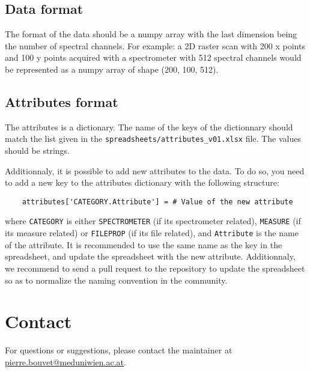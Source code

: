 \documentclass[a4paper,12pt]{article}
\begin{document}
\subsection{Data format}
The format of the data should be a numpy array with the last dimension being the number of spectral channels. For example: a 2D raster scan with 200 x points and 100 y points acquired with a spectrometer with 512 spectral channels would be represented as a numpy array of shape (200, 100, 512).

\subsection{Attributes format}
The attributes is a dictionary. The name of the keys of the dictionnary should match the list given in the \texttt{spreadsheets/attributes\_v01.xlsx} file. The values should be strings.

Additionnaly, it is possible to add new attributes to the data. To do so, you need to add a new key to the attributes dictionary with the following structure:
\begin{verbatim}
    attributes['CATEGORY.Attribute'] = # Value of the new attribute
\end{verbatim}
where \texttt{CATEGORY} is either \texttt{SPECTROMETER} (if its spectrometer related), \texttt{MEASURE} (if its measure related) or \texttt{FILEPROP} (if its file related), and \texttt{Attribute} is the name of the attribute. It is recommended to use the same name as the key in the spreadsheet, and update the spreadsheet with the new attribute. Additionnaly, we recommend to send a pull request to the repository to update the spreadsheet so as to normalize the naming convention in the community.

\section{Contact}
For questions or suggestions, please contact the maintainer at \href{mailto:pierre.bouvet@meduniwien.ac.at}{pierre.bouvet@meduniwien.ac.at}.
\end{document}
